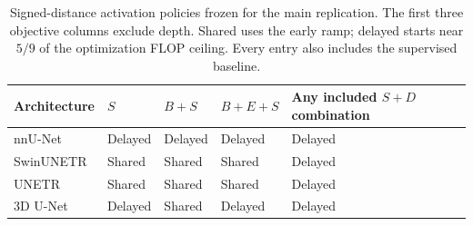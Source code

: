 \documentclass[12pt,a4paper]{article}
\begin{document}
\begin{table}[htbp]
\centering
\small
{}
\renewcommand{\arraystretch}{1.2}
\begin{tabular}{@{}P{3.0cm}P{2.0cm}P{2.2cm}P{2.7cm}P{3.8cm}@{}}
\hline
Architecture & $S$ & $B+S$ & $B+E+S$ & Any included $S+D$ combination \\
\hline
nnU-Net & Delayed & Delayed & Delayed & Delayed \\
SwinUNETR & Shared & Shared & Shared & Delayed \\
UNETR & Shared & Shared & Shared & Delayed \\
3D U-Net & Delayed & Shared & Delayed & Delayed \\
\hline
\end{tabular}
\caption{Signed-distance activation policies frozen for the main
replication. The first three objective columns exclude depth. Shared
uses the early ramp; delayed starts near $5/9$ of the optimization
FLOP ceiling. Every entry also includes the supervised baseline.}
\label{tab:sdf-activation-policies}
\end{table}
\end{document}
